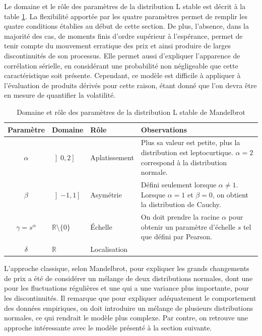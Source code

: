 Le domaine et le rôle des paramètres de la distribution L stable est
décrit à la table \ref{tab:roleparam}. La flexibilité apportée par les
quatre paramètres permet de remplir les quatre conditions établies au
début de cette section. De plus, l'absence, dans la majorité des cas,
de moments finis d'ordre supérieur à l'espérance, permet de tenir
compte du mouvement erratique des prix et ainsi produire de larges
discontinuités de son processus. Elle permet aussi d'expliquer
l'apparence de corrélation sérielle, en considérant une probabilité
non négligeable que cette caractéristique soit présente. Cependant, ce
modèle est difficile à appliquer à l'évaluation de produits dérivés
pour cette raison, étant donné que l'on devra être en mesure de
quantifier la volatilité.
\begin{table}[!ht]
  \centering
  \begin{tabular}{|c|p{1.75cm}|p{2.5cm}|p{6.25cm}|}
    \hline
    \textbf{Paramètre} & \textbf{Domaine} & \textbf{Rôle} & \textbf{Observations} \\
    \hline
    $\alpha$ & $\left]0,2\right]$ & Aplatissement & Plus sa valeur est petite, plus la distribution est leptocurtique. $\alpha=2$ correspond à la distribution normale. \\
    $\beta$ & $\left] -1, 1 \right]$ & Asymétrie & Défini seulement lorsque $\alpha \neq 1$. Lorsque $\alpha=1$ et $\beta=0$, on obtient la distribution de Cauchy.  \\
    $\gamma = s^{\alpha}$ & $\mathbb{R}\setminus\{0 \}$ & Échelle & On doit prendre la racine $\alpha$ pour obtenir un paramètre d'échelle $s$ tel que défini par Pearson. \\
    $\delta$ & $\mathbb{R}$ & Localisation & \\
    \hline
  \end{tabular}
  \caption{Domaine et rôle des paramètres de la distribution L stable de Mandelbrot}
  \label{tab:roleparam}
\end{table}

L'approche classique, selon Mandelbrot, pour expliquer les grands
changements de prix a été de considérer un mélange de deux
distributions normales, dont une pour les fluctuations régulières et
une qui a une variance plus importante, pour les discontinuités. Il
remarque que pour expliquer adéquatement le comportement des données
empiriques, on doit introduire un mélange de plusieurs distributions
normales, ce qui rendrait le modèle plus complexe. Par contre, on
retrouve une approche intéressante avec le modèle présenté à la
section suivante.

